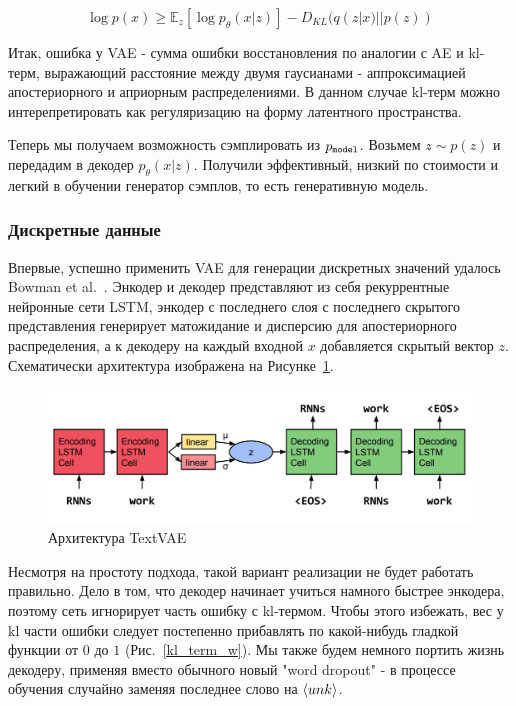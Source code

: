 \documentclass{spbau-diploma}
\begin{document}
\begin{equation}
\label{elbo}
\log p(x) \geqslant \mathbb{E}_z{[\log p_{\theta}(x|z)]} - D_{KL}{(q(z|x) || p(z))}
\end{equation}

Итак, ошибка у VAE - сумма ошибки восстановления по аналогии с AE и kl-терм, 
выражающий расстояние между двумя гаусианами - аппроксимацией апостериорного и
априорным распределениями. В данном случае kl-терм можно интерепретировать как 
регуляризацию на форму латентного пространства.

Теперь мы получаем возможность сэмплировать из $p_{\texttt{model}}$. 
Возьмем $z \sim p(z)$ и передадим в декодер 
$p_{\theta}{(x|z)}$. Получили эффективный, низкий по стоимости и легкий в 
обучении генератор сэмплов, то есть генеративную модель.

\subsubsection{Дискретные данные}
Впервые, успешно применить VAE для генерации дискретных значений удалось 
Bowman et al.~\cite{text_vae}. Энкодер и декодер представляют из себя 
рекуррентные нейронные сети LSTM, энкодер с последнего слоя с последнего 
скрытого представления генерирует матожидание и дисперсию для апостериорного
распределения, а к декодеру на каждый входной $x$ добавляется скрытый вектор
$z$. Схематически архитектура изображена на Рисунке~\ref{text_vae}.

\begin{figure}[H]
\centering
\includegraphics[width=\textwidth]{images/text_vae.png}
\caption{Архитектура TextVAE~\cite{text_vae}}
\label{text_vae}
\end{figure}

Несмотря на простоту подхода, такой вариант реализации не будет работать 
правильно. Дело в том, что декодер начинает учиться намного быстрее энкодера,
поэтому сеть игнорирует часть ошибку с kl-термом. 
Чтобы этого избежать, вес у kl части 
ошибки следует постепенно прибавлять по какой-нибудь гладкой функции от $0$ 
до $1$ (Рис.~\ref{kl_term_w}). Мы также будем немного портить жизнь декодеру, 
применяя вместо обычного новый "word dropout" - в процессе обучения случайно 
заменяя последнее слово на $\langle unk \rangle$.
\end{document}
